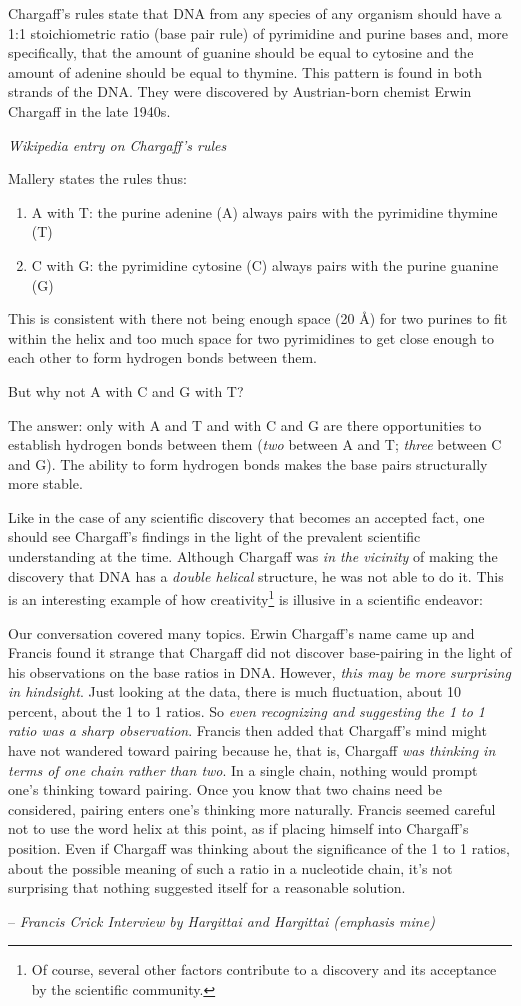 \epigraph{
    Chargaff's rules state that DNA from any species of any organism should have a 1:1 stoichiometric ratio (base pair rule) of pyrimidine and purine bases and, more specifically, that the amount of guanine should be equal to cytosine and the amount of adenine should be equal to thymine. This pattern is found in both strands of the DNA. They were discovered by Austrian-born chemist Erwin Chargaff in the late 1940s.
}{
    \textit{Wikipedia entry on Chargaff's rules}
}

Mallery \cite{mallery} states the rules thus:
\begin{enumerate}
    \item A with T: the purine adenine (A) always pairs with the pyrimidine thymine (T)
    \item C with G:  the pyrimidine cytosine (C) always pairs with the purine guanine (G)
\end{enumerate}

This is consistent with there not being enough space (20 \si{\angstrom}) for two purines to fit within the helix and too much space for two pyrimidines to get close enough to each other to form hydrogen bonds between them.

But why not A with C and G with T?

The answer: only with A and T and with C and G are there opportunities to establish hydrogen bonds between them (\emph{two} between A and T; \emph{three} between C and G). The ability to form hydrogen bonds makes the base pairs structurally more stable.

Like in the case of any scientific discovery that becomes an accepted fact, one should see Chargaff's findings in the light of the prevalent scientific understanding at the time. Although Chargaff was \emph{in the vicinity} of making the discovery that DNA has a \emph{double helical} structure, he was not able to do it. This is an interesting example of how creativity\footnote{Of course, several other factors contribute to a discovery and its acceptance by the scientific community.} is illusive in a scientific endeavor: 
\epigraph{
    Our conversation covered many topics. Erwin Chargaff's name came
up and Francis found it strange that Chargaff did not discover base-pairing
in the light of his observations on the base ratios in DNA. However, \emph{this may be more surprising in hindsight}. Just looking at the data, there is much fluctuation, about 10 percent, about the 1 to 1 ratios. So \emph{even recognizing and suggesting the 1 to 1 ratio was a sharp observation}. Francis then added that Chargaff's mind might have not wandered toward pairing
because he, that is, Chargaff \emph{was thinking in terms of one chain rather than two}. In a single chain, nothing would prompt one's thinking toward pairing. Once you know that two chains need be considered, pairing enters
one's thinking more naturally. Francis seemed careful not to use the word
helix at this point, as if placing himself into Chargaff's position. Even if Chargaff was thinking about the significance of the 1 to 1 ratios, about
the possible meaning of such a ratio in a nucleotide chain, it's not surprising that nothing suggested itself for a reasonable solution.
}
{
    -- \textit{Francis Crick Interview by Hargittai and Hargittai \cite{ih-mh} (emphasis mine)}
}
